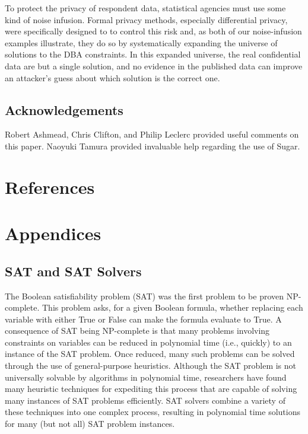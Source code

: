 \documentclass[runningheads]{llncs}
\begin{document}
To protect the privacy of respondent data, statistical
agencies must use some kind of noise infusion. 
Formal privacy methods, especially differential privacy, were specifically
designed to to control this risk and, as both of our noise-infusion examples
illustrate, they do so by systematically expanding the universe of solutions
to the DBA constraints. In this expanded universe, the real confidential data
are but a single solution, and no evidence in the published data can improve 
an attacker's guess about which solution is the correct one.

\subsection{Acknowledgements}
Robert Ashmead, Chris Clifton, and Philip Leclerc provided useful
comments on this paper. Naoyuki Tamura provided invaluable help
regarding the use of Sugar.

\section{References}




\section{Appendices}

\subsection{SAT and SAT Solvers}

The Boolean satisfiability problem (SAT) was the first
problem to be proven NP-complete\cite{cooklevin}. This problem asks,
for a given Boolean formula, whether replacing each variable with
either True or False can make the formula evaluate to True.  A
consequence of SAT being NP-complete is that many problems involving
constraints on variables can be
reduced in polynomial time (i.e., quickly) to an instance of the SAT
problem. Once reduced, many such problems can be solved through the
use of general-purpose heuristics. Although the SAT problem is not universally solvable by
algorithms in polynomial time, researchers have found many heuristic
techniques for expediting this process that are capable of solving many instances of SAT problems efficiently. SAT solvers combine a variety
of these techniques into one complex process, resulting in polynomial
time solutions for many (but not all) SAT problem instances.
\end{document}
